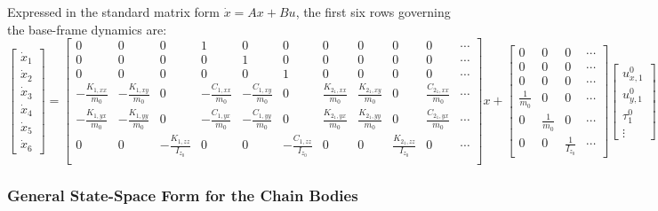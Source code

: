 Expressed in the standard matrix form $\dot{x} = Ax + Bu$, the first six rows governing the base-frame dynamics are:
\setcounter{MaxMatrixCols}{20}
\begin{equation}
\begin{bmatrix}\dot{x}_1\\\dot{x}_2\\\dot{x}_3\\\dot{x}_4\\\dot{x}_5\\\dot{x}_6\end{bmatrix}
=
\begin{bmatrix}
    0 & 0 & 0 & 1 & 0 & 0 & 0 & 0 & 0 & 0 & \cdots \\
    0 & 0 & 0 & 0 & 1 & 0 & 0 & 0 & 0 & 0 & \cdots \\
    0 & 0 & 0 & 0 & 0 & 1 & 0 & 0 & 0 & 0 & \cdots \\
    -\frac{K_{1,xx}}{m_0} & -\frac{K_{1,xy}}{m_0} & 0 &
    -\frac{C_{1,xx}}{m_0} & -\frac{C_{1,xy}}{m_0} & 0 &
    \frac{K_{2_1,xx}}{m_0} & \frac{K_{2_1,xy}}{m_0} & 0 &
    \frac{C_{2_1,xx}}{m_0} & \cdots \\
    -\frac{K_{1,yx}}{m_0} & -\frac{K_{1,yy}}{m_0} & 0 &
    -\frac{C_{1,yx}}{m_0} & -\frac{C_{1,yy}}{m_0} & 0 &
    \frac{K_{2_1,yx}}{m_0} & \frac{K_{2_1,yy}}{m_0} & 0 &
    \frac{C_{2_1,yx}}{m_0} & \cdots \\
    0 & 0 & -\frac{K_{1,zz}}{I_{z_0}} & 0 & 0 &
    -\frac{C_{1,zz}}{I_{z_0}} & 0 & 0 &
    \frac{K_{2_1,zz}}{I_{z_0}} & 0 & \cdots \\
\end{bmatrix}
x
+
\begin{bmatrix}
    0 & 0 & 0 & \cdots \\
    0 & 0 & 0 & \cdots \\
    0 & 0 & 0 & \cdots \\
    \frac{1}{m_0} & 0 & 0 & \cdots \\
    0 & \frac{1}{m_0} & 0 & \cdots \\
    0 & 0 & \frac{1}{I_{z_0}} & \cdots
\end{bmatrix}
\begin{bmatrix}u^0_{x,1}\\u^0_{y,1}\\\tau^0_1\\\vdots\end{bmatrix}
\end{equation}

\subsubsection{General State-Space Form for the Chain Bodies}

